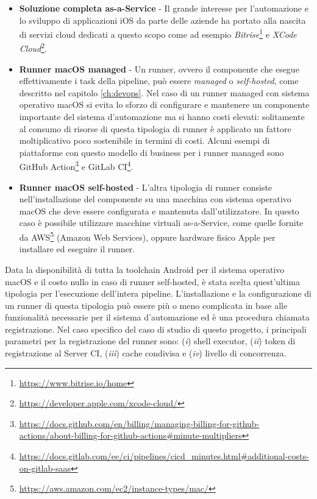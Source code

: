 \begin{itemize}
    \item \textbf{Soluzione completa as-a-Service} - Il grande interesse per l'automazione e lo sviluppo di applicazioni iOS da parte delle aziende ha portato alla nascita di servizi cloud dedicati a questo scopo come ad esempio \textit{Bitrise}\footnote{\href{https://www.bitrise.io/home}{https://www.bitrise.io/home}} e \textit{XCode Cloud}\footnote{\href{https://developer.apple.com/xcode-cloud/}{https://developer.apple.com/xcode-cloud/}}.
    
    \item \textbf{Runner macOS managed} - Un runner, ovvero il componente che esegue effettivamente i task della pipeline, può essere \textit{managed} o \textit{self-hosted}, come descritto nel capitolo \ref{ch:devops}. Nel caso di un runner managed con sistema operativo macOS si evita lo sforzo di configurare e mantenere un componente importante del sistema d'automazione ma si hanno costi elevati: solitamente al consumo di risorse di questa tipologia di runner è applicato un fattore moltiplicativo poco sostenibile in termini di costi. Alcuni esempi di piattaforme con questo modello di business per i runner managed sono GitHub Action\footnote{\href{https://docs.github.com/en/billing/managing-billing-for-github-actions/about-billing-for-github-actions\#minute-multipliers}{https://docs.github.com/en/billing/managing-billing-for-github-actions/about-billing-for-github-actions\#minute-multipliers}} e GitLab CI\footnote{\href{https://docs.gitlab.com/ee/ci/pipelines/cicd\_minutes.html\#additional-costs-on-gitlab-saas}{https://docs.gitlab.com/ee/ci/pipelines/cicd\_minutes.html\#additional-costs-on-gitlab-saas}}.
    
    \item \textbf{Runner macOS self-hosted} - L'altra tipologia di runner consiste nell'installazione del componente su una macchina con sistema operativo macOS che deve essere configurata e mantenuta dall'utilizzatore. In questo caso è possibile utilizzare macchine virtuali as-a-Service, come quelle fornite da AWS\footnote{\href{https://aws.amazon.com/ec2/instance-types/mac/}{https://aws.amazon.com/ec2/instance-types/mac/}} (Amazon Web Services), oppure hardware fisico Apple per installare ed eseguire il runner.
\end{itemize}

Data la disponibilità di tutta la toolchain Android per il sistema operativo macOS e il costo nullo in caso di runner self-hosted, 
è stata scelta quest'ultima tipologia per l'esecuzione dell'intera pipeline.
L'installazione e la configurazione di un runner di questa tipologia può essere più o meno complicata in base alle funzionalità necessarie per il sistema d'automazione ed è una procedura chiamata registrazione. 
Nel caso specifico del caso di studio di questo progetto, 
i principali parametri per la registrazione del runner sono: 
(\textit{i}) shell executor, 
(\textit{ii}) token di registrazione al Server CI, 
(\textit{iii}) cache condivisa e (\textit{iv}) livello di concorrenza.

